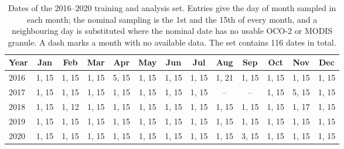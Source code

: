 \begin{table}[t]
\centering
\caption{Dates of the 2016--2020 training and analysis set. Entries give the
day of month sampled in each month; the nominal sampling is the 1st and the
15th of every month, and a neighbouring day is substituted where the nominal
date has no usable OCO-2 or MODIS granule. A dash marks a month with no
available data. The set contains 116 dates in total.}
\label{tab:dates_training}
\setlength{\tabcolsep}{3.2pt}
\footnotesize
\begin{tabular}{@{}lcccccccccccc@{}}
\toprule
Year & Jan & Feb & Mar & Apr & May & Jun & Jul & Aug & Sep & Oct & Nov & Dec \\
\midrule
2016 & 1, 15 & 1, 15 & 1, 15 & 5, 15 & 1, 15 & 1, 15 & 1, 15 & 1, 21 & 1, 15 & 1, 15 & 1, 15 & 1, 15 \\
2017 & 1, 15 & 1, 15 & 1, 15 & 1, 15 & 1, 15 & 1, 15 & 1, 15 & -- & -- & 1, 15 & 5, 15 & 1, 15 \\
2018 & 1, 15 & 1, 12 & 1, 15 & 1, 15 & 1, 15 & 1, 15 & 1, 15 & 1, 15 & 1, 15 & 1, 15 & 1, 17 & 1, 15 \\
2019 & 1, 15 & 1, 15 & 1, 15 & 1, 15 & 1, 15 & 1, 15 & 1, 15 & 1, 15 & 1, 15 & 1, 15 & 1, 15 & 1, 15 \\
2020 & 1, 15 & 1, 15 & 1, 15 & 1, 15 & 1, 15 & 1, 15 & 1, 15 & 1, 15 & 3, 15 & 1, 15 & 1, 15 & 1, 15 \\
\bottomrule
\end{tabular}
\end{table}

